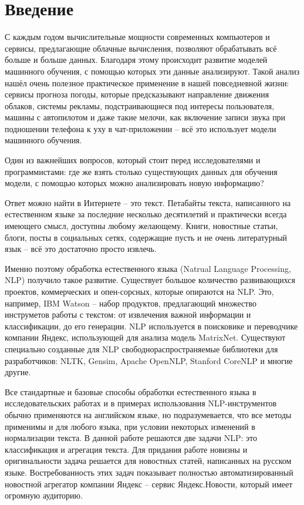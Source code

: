 \documentclass[a4paper, 14pt]{extarticle}
\begin{document}

\section{Введение}
С каждым годом вычислительные мощности современных компьютеров и сервисы, предлагающие облачные вычисления, позволяют обрабатывать всё больше и больше данных. Благодаря этому происходит развитие моделей машинного обучения, с помощью которых эти данные анализируют. Такой анализ нашёл очень полезное практическое применение в нашей повседневной жизни: сервисы прогноза погоды, которые предсказывают направление движения облаков, системы рекламы, подстраивающиеся под интересы пользователя, машины с автопилотом и даже такие мелочи, как включение записи звука при подношении телефона к уху в чат-приложении -- всё это использует модели машинного обучения.

Один из важнейших вопросов, который стоит перед исследователями и программистами: где же взять столько существующих данных для обучения модели, с помощью которых можно анализировать новую информацию?

Ответ можно найти в Интернете -- это текст. Петабайты текста, написанного на естественном языке за последние несколько десятилетий и практически всегда имеющего смысл, доступны любому желающему. Книги, новостные статьи, блоги, посты в социальных сетях, содержащие пусть и не очень литературный язык -- всё это достаточно просто извлечь.

Именно поэтому обработка естественного языка (Natrual Language Processing, NLP) получило такое развитие. Существует большое количество развивающихся проектов, коммерческих и опен-сорсных, которые опираются на NLP. Это, например, IBM Watson -- набор продуктов, предлагающий множество инструметов работы с текстом: от извлечения важной информации и классификации, до его генерации. %
NLP используется в поисковике и переводчике компании Яндекс, использующей для анализа модель MatrixNet. %
Существуют специально созданные для NLP свободнораспространяемые библиотеки для разработчиков: NLTK, Gensim, Apache OpenNLP, Stanford CoreNLP и многие другие.

Все стандартные и базовые способы обработки естественного языка в исследовательских работах и в примерах использования NLP-инструментов обычно применяются на английском языке, но подразумевается, что все методы применимы и для любого языка, при условии некоторых изменений в нормализации текста.
В данной работе решаются две задачи NLP: это классификация и агрегация текста. Для придания работе новизны и оригинальности задача решается для новостных статей, написанных на русском языке. Востребованность этих задач показывает полностью автоматизированный новостной агрегатор компании Яндекс -- сервис Яндекс.Новости, который имеет огромную аудиторию. %
\end{document}
